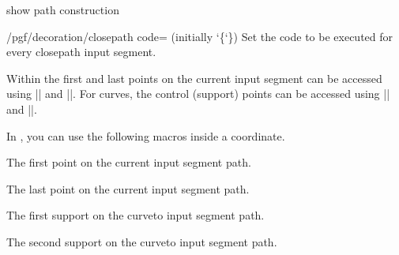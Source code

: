 \begin{decoration}{show path construction}
    \begin{key}{/pgf/decoration/closepath code= (initially \char`\{\char`\})}
        Set the code to be executed for every closepath input segment.
    \end{key}

    Within  the first and last points on the current input segment
    can be accessed using |\pgfpointdecoratedinputsegmentfirst| and
    |\pgfpointdecoratedinputsegmentlast|. For curves, the control (support)
    points can be accessed using |\pgfpointdecoratedinputsegmentsupporta| and
    |\pgfpointdecoratedinputsegmentsupportb|.

    In \tikzname, you can use the following macros inside a \tikzname{}
    coordinate.

    \begin{command}{\tikzinputsegmentfirst}
        The first point on the current input segment path.
    \end{command}

    \begin{command}{\tikzinputsegmentlast}
        The last point on the current input segment path.
    \end{command}

    \begin{command}{\tikzinputsegmentsupporta}
        The first support on the curveto input segment path.
    \end{command}

    \begin{command}{\tikzinputsegmentsupportb}
    The second support on the curveto input segment path.
    \end{command}
{\ifpgfmanualexternalize\tikzexternaldisable\fi
\begin{codeexample}[preamble={\usetikzlibrary{decorations.pathreplacing,shapes.misc}}]

\end{codeexample}
}%
\end{decoration}


